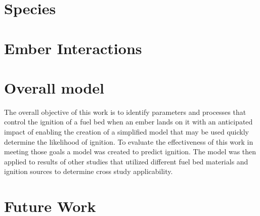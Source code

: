 \section{Species}

\section{Ember Interactions}

\section{Overall model}
    The overall objective of this work is to identify parameters and processes that control the ignition of a fuel bed when an ember lands on it with an anticipated impact of enabling the creation of a simplified model that may be used quickly determine the likelihood of ignition. To evaluate the effectiveness of this work in meeting those goals a model was created to predict ignition. The model was then applied to results of other studies that utilized different fuel bed materials and ignition sources to determine cross study applicability.
    
    

\section{Future Work}